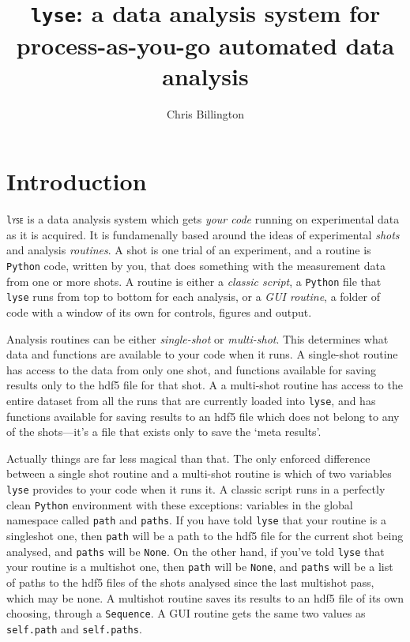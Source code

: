\documentclass[a4paper,11pt,titlepage]{article}
\begin{document}
\title{\texttt{lyse}: a data analysis system for process-as-you-go automated data analysis}
\author{Chris Billington}
\maketitle
\tableofcontents
\section{Introduction}\label{sec:concepts}

\lettrine[lines=3]{\texttt{l}}{\texttt{yse}} is a data analysis system which gets \emph{your code } running on experimental data as it is acquired. It is fundamenally based around the ideas of experimental \emph{shots} and analysis \emph{routines}. A shot is one trial of an experiment, and a routine is \texttt{Python} code, written by you, that does something with the measurement data from one or more shots. A routine is either a \emph{classic script}, a \texttt{Python} file that \texttt{lyse} runs from top to bottom for each analysis, or a \emph{GUI routine}, a folder of code with a window of its own for controls, figures and output.

Analysis routines can be either \emph{single-shot} or \emph{multi-shot}. This determines what data and functions are available to your code when it runs. A single-shot routine has access to the data from only one shot, and functions available for saving results only to the hdf5 file for that shot. A a multi-shot routine has access to the entire dataset from all the runs that are currently loaded into \texttt{lyse}, and has functions available for saving results to an hdf5 file which does not belong to any of the shots---it's a file that exists only to save the `meta results'.

Actually things are far less magical than that. The only enforced difference between a single shot routine and a multi-shot routine is which of two variables \texttt{lyse} provides to your code when it runs it. A classic script runs in a perfectly clean \texttt{Python} environment with these exceptions: variables in the global namespace called \texttt{path} and \texttt{paths}. If you have told \texttt{lyse} that your routine is a singleshot one, then \texttt{path} will be a path to the hdf5 file for the current shot being analysed, and \texttt{paths} will be \texttt{None}. On the other hand, if you've told \texttt{lyse} that your routine is a multishot one, then \texttt{path} will be \texttt{None}, and \texttt{paths} will be a list of paths to the hdf5 files of the shots analysed since the last multishot pass, which may be none. A multishot routine saves its results to an hdf5 file of its own choosing, through a \texttt{Sequence}. A GUI routine gets the same two values as \texttt{self.path} and \texttt{self.paths}.
\end{document}
